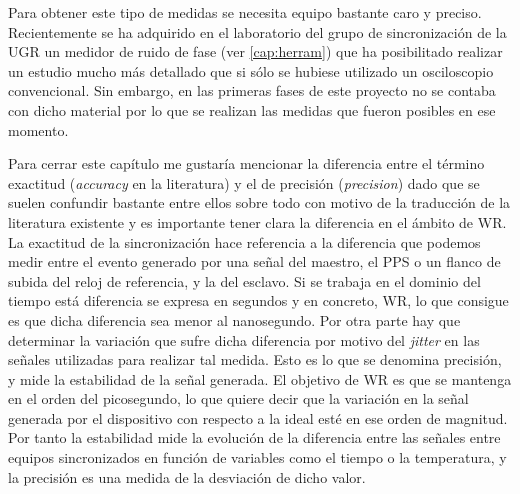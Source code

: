 Para obtener este tipo de medidas se necesita equipo bastante caro y preciso. 
Recientemente se ha adquirido en el laboratorio del grupo de sincronización de 
la UGR un medidor de ruido de fase (ver \ref{cap:herram}) que ha posibilitado 
realizar un estudio mucho más detallado que si sólo se hubiese utilizado un 
osciloscopio convencional. Sin embargo, en las primeras fases de este proyecto 
no se contaba con dicho material por lo que se realizan las medidas que fueron 
posibles en ese momento.

Para cerrar este capítulo me gustaría mencionar la diferencia entre el término 
exactitud (\textit{accuracy} en la literatura) y el de precisión 
(\textit{precision}) dado que se suelen confundir bastante entre ellos sobre 
todo con motivo de la traducción de la literatura existente y es importante 
tener clara la diferencia en el ámbito de WR. La exactitud de la sincronización 
hace referencia a la diferencia que podemos medir entre el evento generado por 
una señal del maestro, el PPS o un flanco de subida del reloj de referencia, y 
la del esclavo. Si se trabaja en el dominio del tiempo está diferencia se 
expresa en segundos y en concreto, WR, lo que consigue es que dicha diferencia 
sea menor al nanosegundo. Por otra parte hay que determinar la variación que 
sufre dicha diferencia por motivo del \textit{jitter} en las señales utilizadas 
para realizar tal medida. Esto es lo que se denomina precisión, y mide la 
estabilidad de la señal generada. El objetivo de WR es que se mantenga en el 
orden del picosegundo, lo que quiere decir que la variación en la señal 
generada por el dispositivo con respecto a la ideal esté en ese orden de 
magnitud. Por tanto la estabilidad mide la evolución de la diferencia entre las 
señales entre equipos sincronizados en función de variables como el tiempo o la 
temperatura, y la precisión es una medida de la desviación de dicho valor.

